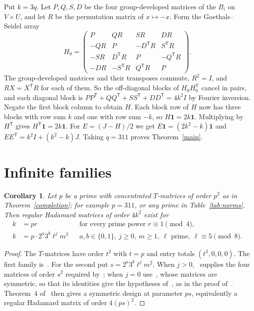 \documentclass[11pt]{article}
\newtheorem{corollary}[theorem]{Corollary}
\theoremstyle{remark}
\newcommand{\one}{\mathbf 1}
\begin{document}
Put $k=3q$. Let $P,Q,S,D$ be the four group-developed matrices of the $B_i$ on $V\times U$, and let $R$ be the permutation matrix of $x\mapsto-x$. Form the Goethals--Seidel array
\[
 H_0=\begin{pmatrix}
 P&QR&SR&DR\\
 -QR&P&-D^{\mathsf T}R&S^{\mathsf T}R\\
 -SR&D^{\mathsf T}R&P&-Q^{\mathsf T}R\\
 -DR&-S^{\mathsf T}R&Q^{\mathsf T}R&P
 \end{pmatrix}.
\]
The group-developed matrices and their transposes commute, $R^2=I$, and $RX=X^{\mathsf T}R$ for each of them. So the off-diagonal blocks of $H_0H_0^{\mathsf T}$ cancel in pairs, and each diagonal block is $PP^{\mathsf T}+QQ^{\mathsf T}+SS^{\mathsf T}+DD^{\mathsf T}=4k^2I$ by Fourier inversion. Negate the first block column to obtain $H$. Each block row of $H$ now has three blocks with row sum $k$ and one with row sum $-k$, so $H\one=2k\one$. Multiplying by $H^{\mathsf T}$ gives $H^{\mathsf T}\one=2k\one$. For $E=(J-H)/2$ we get $E\one=(2k^2-k)\one$ and $EE^{\mathsf T}=k^2I+(k^2-k)J$. Taking $q=311$ proves Theorem~\ref{main}.

\section{Infinite families}\label{sec:families}
\begin{corollary}\label{family}
Let $p$ be a prime with concentrated $T$-matrices of order $p^2$ as in Theorem~\ref{completion}; for example $p=311$, or any prime in Table~\ref{tab:norms}. Then regular Hadamard matrices of order $4k^2$ exist for
\begin{align*}
 k&=pr &&\text{for every prime power }r\equiv1\pmod4,\\
 k&=p\cdot2^a3^b\ell^jm^2 && a,b\in\{0,1\},\ j\ge0,\ m\ge1,\ \ell\text{ prime},\ \ell\equiv5\pmod8.
\end{align*}
\end{corollary}
\begin{proof}
The $T$-matrices have order $t^2$ with $t=p$ and entry totals $(t^3,0,0,0)$. The first family is~\cite[Theorem~3]{XXS}. For the second put $s=2^a3^b\ell^jm^2$. When $j>0$,~\cite[Proposition~1]{XXS} supplies the four matrices of order $s^2$ required by~\cite[Theorem~4]{XXS}; when $j=0$ use~\cite[Lemma~4]{XXS}, whose matrices are symmetric, so that its identities give the hypotheses of~\cite[Theorem~4]{XXS}, as in the proof of~\cite[Proposition~1]{XXS}. Theorem~4 of~\cite{XXS} then gives a symmetric design at parameter $ps$, equivalently a regular Hadamard matrix of order $4(ps)^2$.
\end{proof}
\end{document}
